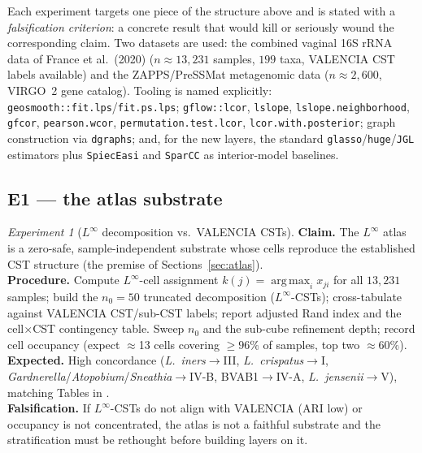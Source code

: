 \documentclass[11pt]{article}
\theoremstyle{definition}
\theoremstyle{plain}
\theoremstyle{remark}
\newtheorem{experiment}{Experiment}
\newcommand{\Linf}{L^{\infty}}
\newcommand{\argmax}{\operatorname*{arg\,max}}
\newcommand{\1}{\mathbf{1}}
\begin{document}
Each experiment targets one piece of the structure above and is stated with a
\emph{falsification criterion}: a concrete result that would kill or seriously
wound the corresponding claim. Two datasets are used: the combined vaginal 16S
rRNA data of France et al.\ (2020) \cite{france2020} ($n\approx13{,}231$ samples,
$199$ taxa, VALENCIA CST labels available) and the ZAPPS/PreSSMat metagenomic
data ($n\approx2{,}600$, VIRGO~2 gene catalog). Tooling is named explicitly:
\texttt{geosmooth::fit.lps}/\texttt{fit.ps.lps}; \texttt{gflow::lcor},
\texttt{lslope}, \texttt{lslope.neighborhood}, \texttt{gfcor},
\texttt{pearson.wcor}, \texttt{permutation.test.lcor}, \texttt{lcor.with.posterior};
graph construction via \texttt{dgraphs}; and, for the new layers, the standard
\texttt{glasso}/\texttt{huge}/\texttt{JGL} estimators plus \texttt{SpiecEasi} and
\texttt{SparCC} as interior-model baselines.

\subsection{E1 --- the atlas substrate}
\begin{experiment}[$\Linf$ decomposition vs.\ VALENCIA CSTs]\label{exp:atlas}
\textbf{Claim.} The $\Linf$ atlas is a zero-safe, sample-independent substrate
whose cells reproduce the established CST structure (the premise of
Sections~\ref{sec:atlas}).\\
\textbf{Procedure.} Compute $\Linf$-cell assignment $k(j)=\argmax_i x_{ji}$ for
all $13{,}231$ samples; build the $n_0{=}50$ truncated decomposition
($\Linf$-CSTs); cross-tabulate against VALENCIA CST/sub-CST labels; report
adjusted Rand index and the cell$\times$CST contingency table. Sweep $n_0$ and
the sub-cube refinement depth; record cell occupancy (expect $\approx$13 cells
covering $\ge96\%$ of samples, top two $\approx60\%$).\\
\textbf{Expected.} High concordance (\emph{L.\ iners}$\to$III,
\emph{L.\ crispatus}$\to$I, \emph{Gardnerella}/\emph{Atopobium}/\emph{Sneathia}$\to$IV-B,
BVAB1$\to$IV-A, \emph{L.\ jensenii}$\to$V), matching Tables in \cite{linf}.\\
\textbf{Falsification.} If $\Linf$-CSTs do not align with VALENCIA (ARI low) or
occupancy is not concentrated, the atlas is not a faithful substrate and the
stratification must be rethought before building layers on it.
\end{experiment}
\end{document}
